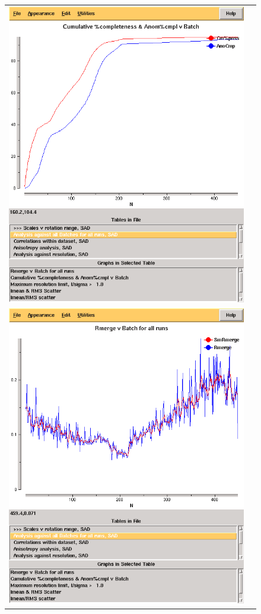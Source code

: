 \documentclass[a4paper, 11pt]{article}
\begin{document}
\begin{figure}
\begin{tabular}{cc}
  \includegraphics[scale=0.25]{figures/3qrn-all-complete-aimless.png} \\
\else
  \includegraphics[scale=0.4, bb=0 0 1212 1524]{figures/3qrn-all-rmerge-aimless.png} & 

\end{tabular}
\end{figure}
\end{document}
